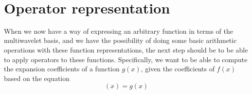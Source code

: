 
\pagebreak
\ \\
\pagebreak
\section{Operator representation}

When we now have a way of expressing an arbitrary function in terms of the
multiwavelet basis, and we have the possibility of doing some basic arithmetic
operations with these function representations, the next step should be to be
able to apply operators to these functions. Specifically, we want to be able
to compute the expansion coefficients of a function $g(x)$, given the
coefficients of $f(x)$ based on the equation 
\begin{equation}
	[Tf](x) = g(x)
\end{equation}

